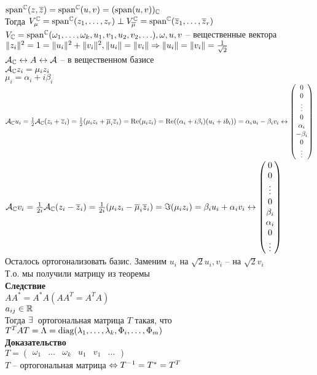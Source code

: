 \documentclass[12pt]{article}
\begin{document}
$\operatorname{span}^\mathbb{C}(z, \overline z) = \operatorname{span}^\mathbb{C}(u, v) = (\operatorname{span}(u,v))_\mathbb{C}$\\
Тогда $V_\mu^\mathbb{C} = \operatorname{span}^\mathbb{C}(z_1, \ldots, z_r) \perp V_{\overline \mu}^\mathbb{C} = \operatorname{span}^\mathbb{C}(\overline z_1, \ldots, \overline z_r)$\\
$V_\mathbb{C} = \operatorname{span}^\mathbb{C}(\omega_1, \ldots, \omega_k, u_1, v_1, u_2, v_2, \ldots), \omega, u, v$ -- вещественные вектора\\
$\|z_i\|^2 = 1 = \|u_i\|^2 + \|v_i\|^2, \|u_i\|=\|v_i\| \Rightarrow \|u_i\|=\|v_i\| = \frac1{\sqrt{2}}$\\
$\mathcal{A}_\mathbb{C} \leftrightarrow A \leftrightarrow \mathcal{A}$ -- в вещественном базисе\\
$\mathcal{A}_\mathbb{C} z_i = \mu_i z_i$\\
$\mu_i = \alpha_i + i \beta_i$\\
$\mathcal{A}_\mathbb{C} u_i = \frac12 \mathcal{A}_{\mathbb{C}}(z_i + \overline z_i) = \frac12(\mu_i z_i + \overline \mu_i \overline z_i) = \operatorname{Re}(\mu_i z_i) = \operatorname{Re}(( \alpha_i + i \beta_i)(u_i + i b_i)) = \alpha_i u_i - \beta_i v_i \leftrightarrow \begin{pmatrix}0\\0\\\vdots\\0\\ \alpha_i \\ - \beta_i\\0\\\vdots\end{pmatrix}$\\
$\mathcal{A}_\mathbb{C} v_i = \frac1{2i} \mathcal{A}_\mathbb{C}(z_i - \overline z_i) = \frac1{2i}(\mu_iz_i - \overline \mu_i \overline z_i) = \Im (\mu_i z_i) = \beta_i u_i + \alpha_i v_i \leftrightarrow \begin{pmatrix}0\\0\\\vdots\\0\\\beta_i\\\alpha_i\\0\\\vdots\end{pmatrix}$\\
Осталось ортогонализовать базис. Заменим $u_i$ на $\sqrt2u_i, v_i$ -- на $\sqrt2v_i$\\
Т.о. мы получили матрицу из теоремы\\
\textbf{Следствие}\\
$AA^* = A^*A(AA^T = A^TA)$\\
$a_{ij} \in \mathbb{R}$\\
Тогда $\exists\,$ ортогональная матрица $T$ такая, что $T^T AT = \Lambda = \operatorname{diag}( \lambda_1, \ldots, \lambda_k, \Phi_i, \ldots, \Phi_m)$\\
\textbf{Доказательство}\\
$T = \begin{pmatrix}\omega_1 & \ldots & \omega_k & u_1 & v_1 & \ldots\end{pmatrix}$\\
$T$ -- ортогональная матрица $\Leftrightarrow T^{-1} = T^* = T^T$
\end{document}
